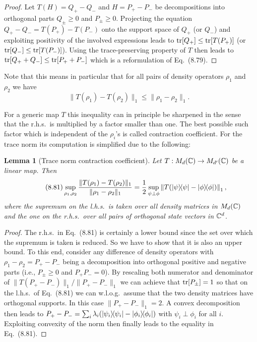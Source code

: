 \documentclass[11pt,a4paper]{article}
\theoremstyle{plain}
\newtheorem{lemma}{Lemma}[section]
\theoremstyle{definition}
\theoremstyle{remark}
\begin{document}
\begin{proof}
    Let $T(H)=Q_+-Q_-$ and $H=P_+-P_-$ be decompositions into orthogonal parts $Q_\pm\ge 0$ and $P_\pm\ge 0$.
    Projecting the equation $Q_+-Q_-=T(P_+)-T(P_-)$ onto the support space of $Q_+$ (or $Q_-$) and exploiting positivity of the involved expressions
    leads to $\operatorname{tr}[Q_+]\le \operatorname{tr}[T(P_+)]$ (or $\operatorname{tr}[Q_-]\le \operatorname{tr}[T(P_-)]$). Using the trace-preserving property of $T$ then leads to
    $\operatorname{tr}[Q_+ + Q_-]\le \operatorname{tr}[P_+ + P_-]$ which is a reformulation of Eq.~(8.79).
\end{proof}

Note that this means in particular that for all pairs of density operators $\rho_1$ and $\rho_2$ we have
\begin{equation}\tag{8.80}
    \|T(\rho_1)-T(\rho_2)\|_1 \le \|\rho_1-\rho_2\|_1.
\end{equation}

For a generic map $T$ this inequality can in principle be sharpened in the sense that the r.h.s.\ is multiplied by a factor smaller than one.
The best possible such factor which is independent of the $\rho_i$'s is called contraction coefficient. For the trace norm its computation is simplified due to the following:

\begin{lemma}[Trace norm contraction coefficient]
    Let $T:M_d(\mathbb{C})\to M_{d'}(\mathbb{C})$ be a linear map. Then
    \begin{equation}\tag{8.81}
        \sup_{\rho_1,\rho_2}\frac{\|T(\rho_1)-T(\rho_2)\|_1}{\|\rho_1-\rho_2\|_1}
        =
        \frac{1}{2}\sup_{\psi\perp\phi}\left\|T\!\left(|\psi\rangle\!\langle\psi|-|\phi\rangle\!\langle\phi|\right)\right\|_1,
    \end{equation}
    where the supremum on the l.h.s.\ is taken over all density matrices in $M_d(\mathbb{C})$ and the one on the r.h.s.\ over all pairs of orthogonal state vectors in $\mathbb{C}^d$.
\end{lemma}

\begin{proof}
    The r.h.s.\ in Eq.~(8.81) is certainly a lower bound since the set over which the supremum is taken is reduced. So we have to show that it is also an upper bound.
    To this end, consider any difference of density operators with $\rho_1-\rho_2=P_+-P_-$ being a decomposition into orthogonal positive and negative parts
    (i.e., $P_\pm\ge 0$ and $P_+P_-=0$). By rescaling both numerator and denominator of $\|T(P_+-P_-)\|_1/\|P_+-P_-\|_1$ we can achieve that $\operatorname{tr}[P_\pm]=1$
    so that on the l.h.s.\ of Eq.~(8.81) we can w.l.o.g.\ assume that the two density matrices have orthogonal supports. In this case $\|P_+-P_-\|_1=2$.
    A convex decomposition then leads to $P_+-P_-=\sum_i \lambda_i(|\psi_i\rangle\!\langle\psi_i|-|\phi_i\rangle\!\langle\phi_i|)$ with $\psi_i\perp\phi_i$ for all $i$.
    Exploiting convexity of the norm then finally leads to the equality in Eq.~(8.81).
\end{proof}
\end{document}
